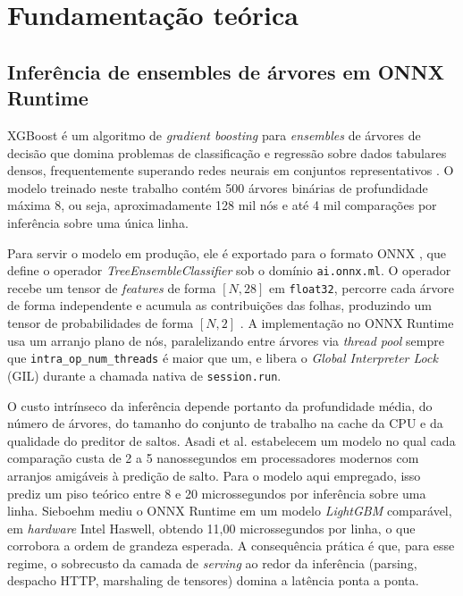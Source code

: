 \section{Fundamentação teórica}

\subsection{Inferência de ensembles de árvores em ONNX Runtime}

XGBoost \cite{chen2016} é um algoritmo de \textit{gradient boosting} para
\textit{ensembles} de árvores de decisão que domina problemas de classificação
e regressão sobre dados tabulares densos, frequentemente superando redes
neurais em conjuntos representativos \cite{grinsztajn2022}. O modelo treinado
neste trabalho contém 500 árvores binárias de profundidade máxima 8, ou seja,
aproximadamente 128 mil nós e até 4 mil comparações por inferência sobre uma
única linha.

Para servir o modelo em produção, ele é exportado para o formato ONNX
\cite{onnxruntime2024}, que define o operador
\textit{TreeEnsembleClassifier} sob o domínio \texttt{ai.onnx.ml}. O operador
recebe um tensor de \textit{features} de forma $[N, 28]$ em
\texttt{float32}, percorre cada árvore de forma independente e acumula as
contribuições das folhas, produzindo um tensor de probabilidades de forma
$[N, 2]$ \cite{onnx_treeensemble}. A implementação no ONNX Runtime usa um
arranjo plano de nós, paralelizando entre árvores via \textit{thread pool}
sempre que \texttt{intra\_op\_num\_threads} é maior que um, e libera o
\textit{Global Interpreter Lock} (GIL) durante a chamada nativa de
\texttt{session.run}.

O custo intrínseco da inferência depende portanto da profundidade média, do
número de árvores, do tamanho do conjunto de trabalho na cache da CPU e da
qualidade do preditor de saltos. Asadi et al. \cite{asadi2014} estabelecem
um modelo no qual cada comparação custa de 2 a 5 nanossegundos em
processadores modernos com arranjos amigáveis à predição de salto. Para o
modelo aqui empregado, isso prediz um piso teórico entre 8 e 20
microssegundos por inferência sobre uma linha. Sieboehm
\cite{sieboehm2021} mediu o ONNX Runtime em um modelo \textit{LightGBM}
comparável, em \textit{hardware} Intel Haswell, obtendo 11,00 microssegundos
por linha, o que corrobora a ordem de grandeza esperada. A consequência
prática é que, para esse regime, o sobrecusto da camada de \textit{serving}
ao redor da inferência (parsing, despacho HTTP, marshaling de tensores)
domina a latência ponta a ponta.


